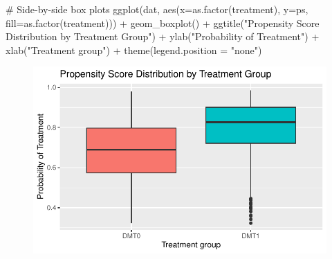 \documentclass[
  letterpaper,
  DIV=11,
  numbers=noendperiod]{scrreprt}
\newenvironment{Shaded}{\begin{snugshade}}{\end{snugshade}}
\newcommand{\AttributeTok}[1]{\textcolor[rgb]{0.40,0.45,0.13}{#1}}
\newcommand{\CommentTok}[1]{\textcolor[rgb]{0.37,0.37,0.37}{#1}}
\newcommand{\FunctionTok}[1]{\textcolor[rgb]{0.28,0.35,0.67}{#1}}
\newcommand{\NormalTok}[1]{\textcolor[rgb]{0.00,0.23,0.31}{#1}}
\newcommand{\SpecialCharTok}[1]{\textcolor[rgb]{0.37,0.37,0.37}{#1}}
\newcommand{\StringTok}[1]{\textcolor[rgb]{0.13,0.47,0.30}{#1}}
\begin{document}
\begin{Shaded}
\begin{Highlighting}[]
\CommentTok{\# Side{-}by{-}side box plots}
\FunctionTok{ggplot}\NormalTok{(dat, }\FunctionTok{aes}\NormalTok{(}\AttributeTok{x=}\FunctionTok{as.factor}\NormalTok{(treatment), }\AttributeTok{y=}\NormalTok{ps, }\AttributeTok{fill=}\FunctionTok{as.factor}\NormalTok{(treatment))) }\SpecialCharTok{+}
  \FunctionTok{geom\_boxplot}\NormalTok{() }\SpecialCharTok{+} 
  \FunctionTok{ggtitle}\NormalTok{(}\StringTok{"Propensity Score Distribution by Treatment Group"}\NormalTok{) }\SpecialCharTok{+}
  \FunctionTok{ylab}\NormalTok{(}\StringTok{"Probability of Treatment"}\NormalTok{) }\SpecialCharTok{+} 
  \FunctionTok{xlab}\NormalTok{(}\StringTok{"Treatment group"}\NormalTok{) }\SpecialCharTok{+}
  \FunctionTok{theme}\NormalTok{(}\AttributeTok{legend.position =} \StringTok{"none"}\NormalTok{)}
\end{Highlighting}
\end{Shaded}

\begin{figure}[H]

{\centering \includegraphics{chapter_06_files/figure-pdf/unnamed-chunk-9-2.pdf}

}

\end{figure}

\begin{Shaded}
\end{Shaded}
\end{document}
